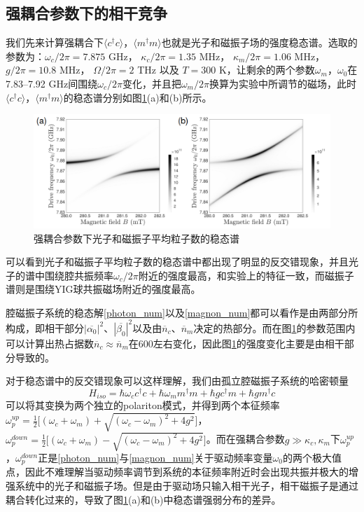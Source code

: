 \subsection{强耦合参数下的相干竞争}
我们先来计算强耦合下$\langle c^{\dag}c \rangle$，$\langle m^{\dag}m \rangle$也就是光子和磁振子场的强度稳态谱。选取的参数为：$\omega_c/2\pi=7.875$ GHz， $\kappa_c/2\pi=1.35$ MHz， $\kappa_m/2\pi=1.06$ MHz， $g/2\pi=10.8$ MHz， $\Omega/2\pi=2$ THz 以及 $T=300$ K，让剩余的两个参数$\omega_m$，$\omega_0$在 7.83--7.92 GHz间围绕$\omega_c/2\pi$变化，并且把$\omega_m/2\pi$换算为实验中所调节的磁场，此时$\langle c^{\dag}c \rangle$，$\langle m^{\dag}m \rangle$的稳态谱分别如图\ref{SC1stOrder}(a)和(b)所示。
\begin{figure}[htbp]
	\centering
	\includegraphics[width=2\basefigurewidth,clip]{./figure/4_1}
	\caption{强耦合参数下光子和磁振子平均粒子数的稳态谱} 
	\label{SC1stOrder}
\end{figure}
可以看到光子和磁振子平均粒子数的稳态谱中都出现了明显的反交错现象，并且光子的谱中围绕腔共振频率$\omega_c/2\pi$附近的强度最高，和实验上的特征一致，而磁振子谱则是围绕YIG球共振磁场附近的强度最高。

腔磁振子系统的稳态解\eqref{photon_num}以及\eqref{magnon_num}都可以看作是由两部分所构成，即相干部分$|\overline{\alpha_{0}}|^{2}$、$|\overline{\beta_{0}}|^{2}$以及由$\overline{n}_c$、$\overline{n}_m$决定的热部分。而在图\ref{SC1stOrder}的参数范围内可以计算出热占据数$\overline{n}_c\approx\overline{n}_m$在600左右变化，因此图\ref{SC1stOrder}的强度变化主要是由相干部分导致的。

对于稳态谱中的反交错现象可以这样理解，我们由孤立腔磁振子系统的哈密顿量
\begin{equation}
H_{iso} = \hbar\omega_{c}c^{\dag}c+\hbar\omega_{m}m^{\dag}m+\hbar gc^{\dag}m+\hbar gm^{\dag}c
\label{HamiltonianIsolated}
\end{equation}
可以将其变换为两个独立的polariton模式，并得到两个本征频率$\omega_p^{up}=\frac{1}{2}\Big[(\omega_c+\omega_m)+\sqrt{(\omega_c-\omega_m)^2+4g^2}\Big]$，$\omega_p^{down}=\frac{1}{2}\Big[(\omega_c+\omega_m)-\sqrt{(\omega_c-\omega_m)^2+4g^2}\Big]$。而在强耦合参数$g\gg\kappa_c,\kappa_m$下$\omega_p^{up}$，$\omega_p^{down}$正是\eqref{photon_num}与\eqref{magnon_num}关于驱动频率变量$\omega_0$的两个极大值点，因此不难理解当驱动频率调节到系统的本征频率附近时会出现共振并极大的增强系统中的光子和磁振子场。但是由于驱动场只输入相干光子，相干磁振子是通过耦合转化过来的，导致了图\ref{SC1stOrder}(a)和(b)中稳态谱强弱分布的差异。

